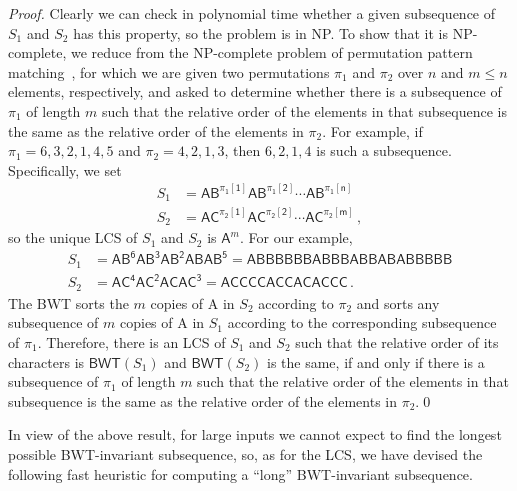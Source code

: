 \documentclass{llncs}
\newcommand{\BWT}
  {\ensuremath{\mathsf{BWT}}}
\begin{document}
\begin{proof}
Clearly we can check in polynomial time whether a given subsequence of $S_1$
and $S_2$ has this property, so the problem is in NP.  To show that it is
NP-complete, we reduce from the NP-complete problem of permutation pattern
matching~\cite{BBL98}, for which we are given two permutations $\pi_1$ and
$\pi_2$ over $n$ and \(m \leq n\) elements, respectively, and asked to
determine whether there is a subsequence of $\pi_1$ of length $m$ such that
the relative order of the elements in that subsequence is the same as the
relative order of the elements in $\pi_2$.  For example, if \(\pi_1 = 6, 3,
2, 1, 4, 5\) and \(\pi_2 = 4, 2, 1, 3\), then \(6, 2, 1, 4\) is such a
subsequence. Specifically, we set
\begin{align*}
S_1 & = \mathsf{A B^{\pi_1 [1]} A B^{\pi_1 [2]} \cdots A B^{\pi_1 [n]}}\\
S_2 & = \mathsf{A C^{\pi_2 [1]} A C^{\pi_2 [2]} \cdots A C^{\pi_2 [m]}}\,,
\end{align*}
so the unique LCS of $S_1$ and $S_2$ is $\mathsf{A}^m$.  For our example,
\begin{align*}
S_1 & = \mathsf{A B^6 A B^3 A B^2 A B A B^5} = \mathsf{A B B B B B B A B B B A B B A B A B B B B B}\\
S_2 & = \mathsf{A C^4 A C^2 A C A C^3} = \mathsf{A C C C C A C C A C A C C C}\,.
\end{align*}
The BWT sorts the $m$ copies of {\sf A} in $S_2$ according to $\pi_2$ and
sorts any subsequence of $m$ copies of {\sf A} in $S_1$ according to the
corresponding subsequence of $\pi_1$.  Therefore, there is an LCS of $S_1$
and $S_2$ such that the relative order of its characters is \(\BWT (S_1)\)
and \(\BWT (S_2)\) is the same, if and only if there is a subsequence of
$\pi_1$ of length $m$ such that the relative order of the elements in that
subsequence is the same as the relative order of the elements in $\pi_2$.\qed
\end{proof}

In view of the above result, for large inputs we cannot expect to find the
longest possible BWT-invariant subsequence, so, as for the LCS, we have
devised the following fast heuristic for computing a ``long'' BWT-invariant
subsequence.
\end{document}
